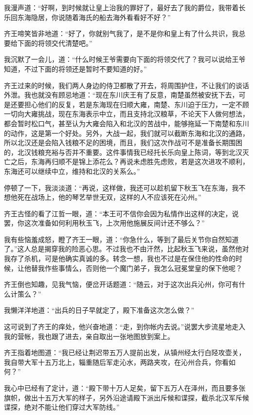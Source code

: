 我漫声道：“好啊，到时候就让皇上治我的罪好了，最好去了我的爵位，我带着长乐回东海隐居，你说随着海氏的船去海外看看好不好？”

齐王啼笑皆非地道：“好了，你就别气我了，是不是你和皇上有了什么共识，我总要给下面的将领交代清楚吧。”

我沉默了一会儿，道：“什么时候王爷需要向下面的将领交代了？我可以说给王爷知道，不过下面的将领还是暂时不要知道的好。”

齐王过来的时候，我们两人身边的侍卫都散了开去，将周围护住，不让我们的谈话外泄。我也就没有顾忌地道：“现在东川庆王有了反意，南楚虽然被安抚下去，可是还要担心他们的反复，若是东海现在归顺大雍，南楚、东川迫于压力，一定不顾一切向大雍挑战，现在东海表示中立，而且支持北汉粮草，不论天下人做何想法，都会暂时松口气，甚至认为大雍会陷入和北汉的苦战中，能够拖延一下南楚和东川的动作，这是第一个好处。另外，大战一起，我们就可以截断东海和北汉的通路，所以北汉还是会陷入钱粮不足的困境，而且，我们这次作战可不是准备长期围困的，北汉钱粮充裕与否并不重要。这件事情我已经托长乐向皇上陈词，等到北汉灭亡之后，东海再归顺不是锦上添花么？再说未虑胜先虑败，若是这次进攻不顺利，东海还可以继续中立，维持和北汉的关系么。”

停顿了一下，我淡淡道：“再说，这样做，我还可以趁机留下秋玉飞在东海，我不想他死在战场上，他的琴艺举世无双，这样的人不应该死在沁州。”

齐王古怪的看了江哲一眼，道：“本王可不信你会因为私情作出这样的决定，说罢，你这次准备如何利用秋玉飞，上次用他施展反间计还不够么？”

我有些恼羞成怒，瞪了齐王一眼，道：“你急什么，等到了最后关节你自然知道了。”这人总是揭穿我的险恶心思。不过我也不由汗然，比起秋玉飞来说，虽然他对我存了杀机，可是他确实真诚的多。转念一想，我也不过是在保住他的性命的时候，让他替我作些事情么，否则他一个魔门弟子，我怎么冠冕堂皇的保下他呢？

齐王倒也知趣，见我气恼，便岔开话题道：“随云，对于这次出兵沁州，你可有什么计策么？”

我懒洋洋地道：“出兵的日子早就定了，殿下准备这次怎么做？”

这可说到了齐王的痒处，他兴奋地道：“走，到你帐内去说。”说罢大步流星地走入我的营帐，我也跟了进去，亲自取出一张地图放到案上。

齐王指着地图道：“我已经让荆迟带五万人提前出发，从镇州经太行白陉攻壶关，我自带大军十五万北上，辎重随后军走沁水，两路夹攻，在沁州合兵，你看如何？”

我心中已经有了定计，道：“殿下带十万人足矣，留下五万人在泽州，而且要多张旗帜，做出十五万大军的样子，另外沿途请殿下派出斥候和谍探，截杀北汉军斥候谍探，绝对不能让他们穿过大军防线。”

